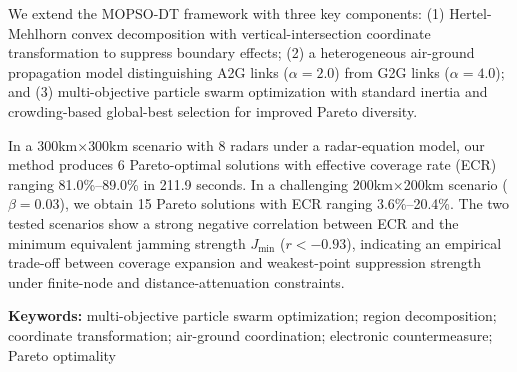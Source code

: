 We extend the MOPSO-DT framework with three key components: (1) Hertel-Mehlhorn convex decomposition with vertical-intersection coordinate transformation to suppress boundary effects; (2) a heterogeneous air-ground propagation model distinguishing A2G links ($\alpha=2.0$) from G2G links ($\alpha=4.0$); and (3) multi-objective particle swarm optimization with standard inertia and crowding-based global-best selection for improved Pareto diversity.

In a 300km$\times$300km scenario with 8 radars under a radar-equation model, our method produces 6 Pareto-optimal solutions with effective coverage rate (ECR) ranging 81.0\%--89.0\% in 211.9 seconds. In a challenging 200km$\times$200km scenario ($\beta=0.03$), we obtain 15 Pareto solutions with ECR ranging 3.6\%--20.4\%. The two tested scenarios show a strong negative correlation between ECR and the minimum equivalent jamming strength $J_{\text{min}}$ ($r < -0.93$), indicating an empirical trade-off between coverage expansion and weakest-point suppression strength under finite-node and distance-attenuation constraints.

\textbf{Keywords:} multi-objective particle swarm optimization; region decomposition; coordinate transformation; air-ground coordination; electronic countermeasure; Pareto optimality
